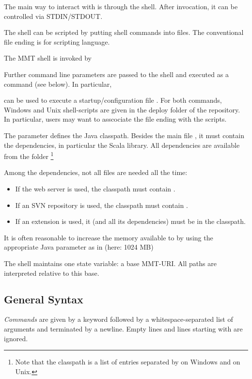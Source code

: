 The main way to interact with \mmt is through the shell.
After invocation, it can be controlled via STDIN/STDOUT.


The shell can be scripted by putting shell commands into files. The conventional file ending is  for \mmt scripting language.

The MMT shell is invoked by
\begin{center}
\end{center}
Further command line parameters are passed to the shell and executed as a command (see below). In particular,
\begin{center}
\end{center}
can be used to execute a startup/configuration file .
For both commands, Windows and Unix shell-scripts are given in the deploy folder of the \mmt repository.
In particular, users may want to asscociate the  file ending with the  scripts.

The  parameter defines the Java classpath. Besides the main file , it must contain the dependencies, in particular the Scala library. All dependencies are available from the folder  \footnote{Note that the classpath is a list of entries separated by \code{;} on Windows and \code{:} on Unix.}

Among the dependencies, not all files are needed all the time:
\begin{itemize}
\item If the {\mmt} web server is used, the classpath must contain  \cite{tiscaf}.
\item If an SVN repository is used, the classpath must contain .
\item If an {\mmt} extension is used, it (and all its dependencies) must be in the classpath.
\end{itemize}

It is often reasonable to increase the memory available to {\mmt} by using the appropriate Java parameter as in (here: 1024 MB) 
\begin{center}
\end{center}

The shell maintains one state variable: a base MMT-URI. All paths are interpreted relative to this base.

\subsection{General Syntax}
\emph{Commands} are given by a keyword followed by a whitespace-separated list of arguments and terminated by a newline. Empty lines and lines starting with \code{//} are ignored.


